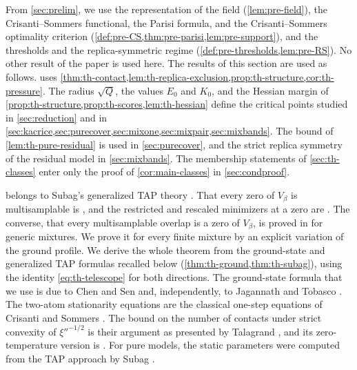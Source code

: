 From \cref{sec:prelim}, we use the representation of the field (\cref{lem:pre-field}), the Crisanti--Sommers functional, the Parisi formula, and the Crisanti--Sommers optimality criterion (\cref{def:pre-CS,thm:pre-parisi,lem:pre-support}), and the thresholds and the replica-symmetric regime (\cref{def:pre-thresholds,lem:pre-RS}). No other result of the paper is used here. The results of this section are used as follows.  uses \cref{thm:th-contact,lem:th-replica-exclusion,prop:th-structure,cor:th-pressure}. The radius $\sqrt Q$, the values $E_0$ and $K_0$, and the Hessian margin of \cref{prop:th-structure,prop:th-scores,lem:th-hessian} define the critical points studied in \cref{sec:reduction} and in \cref{sec:kacrice,sec:purecover,sec:mixone,sec:mixpair,sec:mixbands}. The bound of \cref{lem:th-pure-residual} is used in \cref{sec:purecover}, and the strict replica symmetry of the residual model in \cref{sec:mixbands}. The membership statements of \cref{sec:th-classes} enter only the proof of \cref{cor:main-classes} in \cref{sec:condproof}.

 belongs to Subag's generalized TAP theory \cite{Subag2024}. That every zero of $V_\beta$ is multisamplable is \cite[Theorem~10, (1.39)]{Subag2024}, and the restricted and rescaled minimizers at a zero are \cite[Proposition~11, (1.43)--(1.44)]{Subag2024}. The converse, that every multisamplable overlap is a zero of $V_\beta$, is proved in \cite[Theorem~10, (1.40)]{Subag2024} for generic mixtures. We prove it for every finite mixture by an explicit variation of the ground profile. We derive the whole theorem from the ground-state and generalized TAP formulas recalled below (\cref{thm:th-ground,thm:th-subag}), using the identity \eqref{eq:th-telescope} for both directions. The ground-state formula that we use is due to Chen and Sen \cite{ChenSen2017} and, independently, to Jagannath and Tobasco \cite{JagannathTobasco2017low}. The two-atom stationarity equations are the classical one-step equations of Crisanti and Sommers \cite{CrisantiSommers1992}. The bound on the number of contacts under strict convexity of $\xi''^{-1/2}$ is their argument as presented by Talagrand \cite[Proposition~2.2]{Talagrand2006}, and its zero-temperature version is \cite[Lemma~3.21]{HuangSellke2024}. For pure models, the static parameters were computed from the TAP approach by Subag \cite[Theorems~1 and~2]{Subag2023pure}.

